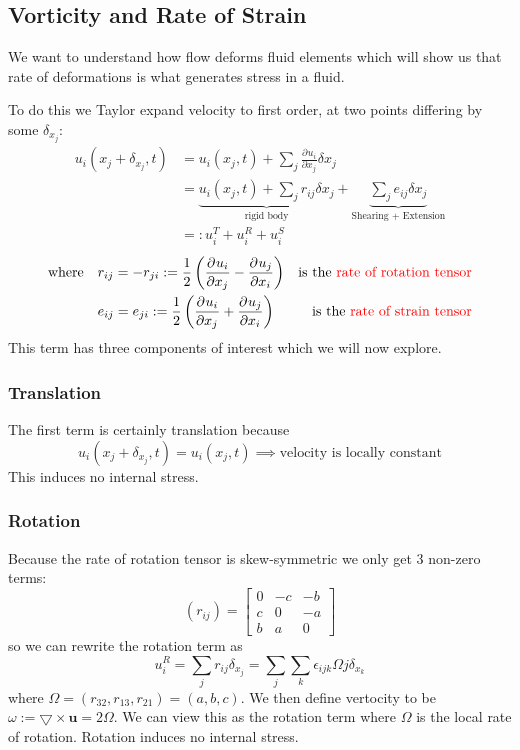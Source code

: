 \documentclass[11pt]{article}
\newcommand*{\pd}[3][]{\ensuremath{\frac{\partial^{#1} {#2}}{\partial {#3}^{#1}}}}
\newcommand{\grad}{\bigtriangledown}
\newcommand{\defeq}{:=}
\newcommand{\eqdef}{=:}
\newcommand{\mv}[1]{\textbf{#1}}
\newcommand{\mdf}[1]{{\color{red}#1}}
\begin{document}
\subsection{Vorticity and Rate of Strain}
We want to understand how flow deforms fluid elements which will show us that rate of deformations is what generates stress in a fluid.

To do this we Taylor expand velocity to first order, at two points differing by some $\delta_{x_j}:$
\begin{align*}
    u_i(x_j+\delta_{x_j},t)&=u_i(x_j,t)+\sum_j \pd{u_i}{x_j}\delta{x_j}\\
    &=\underbrace{u_i(x_j,t)+\sum_j r_{ij}\delta{x_j}}_{\text{rigid body}}+\underbrace{\sum_j e_{ij}\delta{x_j}}_{\text{Shearing + Extension}}\\
    &\eqdef u_i^T + u_i^R + u_i^S
\end{align*}
\begin{align*}
    \text{where} \quad &r_{ij}=-r_{ji}\defeq\frac{1}{2}\left(\pd{u_i}{x_j}-\pd{u_j}{x_i}\right) & \text{is the \mdf{rate of rotation tensor}}\\
    \quad &e_{ij}=e_{ji}\defeq\frac{1}{2}\left(\pd{u_i}{x_j}+\pd{u_j}{x_i}\right) & \text{is the \mdf{rate of strain tensor}}
\end{align*}
This term has three components of interest which we will now explore.
\subsubsection{Translation}
The first term is certainly translation because
$$u_i(x_j+\delta_{x_j},t)=u_i(x_j,t)\implies\text{velocity is locally constant}$$
This induces no internal stress.
\subsubsection{Rotation}
Because the rate of rotation tensor is skew-symmetric we only get 3 non-zero terms:
\[
(r_{ij})=
\begin{bmatrix}
0 & -c & -b\\
c &  0 & -a\\
b &  a &  0
\end{bmatrix}
\]
so we can rewrite the rotation term as
$$u_i^R=\sum_j r_{ij}\delta_{x_j} = \sum_j \sum_k \epsilon_{ijk}\Omega{j}\delta_{x_k}$$
where $\Omega = (r_{32},r_{13},r_{21})=(a,b,c)$.
We then define \mdf{vertocity} to be $\omega\defeq\grad\times\mv{u}=2\Omega$.
We can view this as the rotation term where $\Omega$ is the local rate of rotation. Rotation induces no internal stress.
\end{document}
